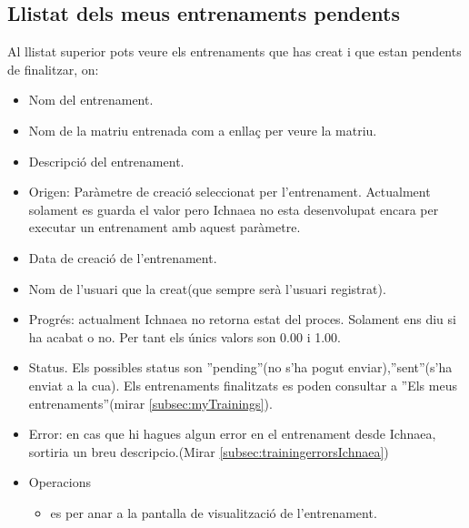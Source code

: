 \subsection{Llistat dels meus entrenaments pendents}
Al llistat superior pots veure els entrenaments que has creat i que estan pendents de finalitzar, on: 
\begin{itemize}
\item Nom del entrenament.
\item Nom de la matriu entrenada com a enllaç per veure la matriu.
\item Descripci\'{o} del entrenament.
\item Origen: Paràmetre de creació seleccionat per l'entrenament. Actualment solament es guarda el valor pero Ichnaea no esta desenvolupat encara per executar un entrenament amb aquest paràmetre.
\item Data de creaci\'{o} de l'entrenament.
\item Nom de l'usuari que la creat(que sempre serà l'usuari registrat).
\item Progr\'{e}s: actualment Ichnaea no retorna estat del proces. Solament ens diu si ha acabat o no. Per tant els \'{u}nics valors son 0.00 i 1.00.
\item Status. Els possibles status son ''pending''(no s'ha pogut enviar),''sent''(s'ha enviat a la cua). Els entrenaments finalitzats es poden consultar a ''Els meus entrenaments''(mirar \ref{subsec:myTrainings}).
\item Error: en cas que hi hagues algun error en el entrenament desde Ichnaea, sortiria un breu descripcio.(Mirar \ref{subsec:trainingerrorsIchnaea})
\item Operacions
 \begin{itemize}
 \item \iconeyeopen es per anar a la pantalla de visualització de l'entrenament.
 \end{itemize}
\end{itemize}

